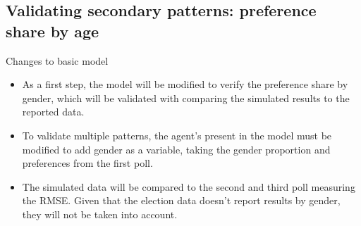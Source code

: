 \documentclass{beamer}
\begin{document}
%
%

\subsection{Validating secondary patterns: preference share by age}
\begin{frame}{Changes to basic model}
	\begin{itemize}
		\item As a first step, the model will be modified to verify the preference share by gender, which will be validated with comparing the simulated results to the reported data.
		\item To validate multiple patterns, the agent's present in the model must be modified to add gender as a variable, taking the gender proportion and preferences from the first poll.
		\item The simulated data will be compared to the second and third poll measuring the RMSE. Given that the election data doesn't report results by gender, they will not be taken into account.
	\end{itemize}
\end{frame}
\end{document}
